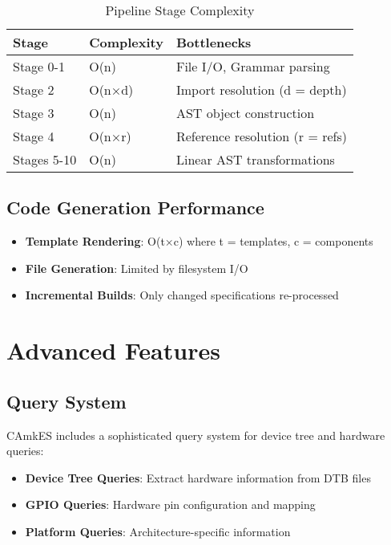 \documentclass[12pt,a4paper]{article}
\begin{document}
\begin{table}[h!]
\centering
\begin{tabular}{@{}lll@{}}
\toprule
\textbf{Stage} & \textbf{Complexity} & \textbf{Bottlenecks} \\
\midrule
Stage 0-1 & O(n) & File I/O, Grammar parsing \\
Stage 2 & O(n×d) & Import resolution (d = depth) \\
Stage 3 & O(n) & AST object construction \\
Stage 4 & O(n×r) & Reference resolution (r = refs) \\
Stages 5-10 & O(n) & Linear AST transformations \\
\bottomrule
\end{tabular}
\caption{Pipeline Stage Complexity}
\end{table}

\subsection{Code Generation Performance}
\begin{itemize}
    \item \textbf{Template Rendering}: O(t×c) where t = templates, c = components
    \item \textbf{File Generation}: Limited by filesystem I/O
    \item \textbf{Incremental Builds}: Only changed specifications re-processed
\end{itemize}

\section{Advanced Features}

\subsection{Query System}
CAmkES includes a sophisticated query system for device tree and hardware queries:

\begin{itemize}
    \item \textbf{Device Tree Queries}: Extract hardware information from DTB files
    \item \textbf{GPIO Queries}: Hardware pin configuration and mapping
    \item \textbf{Platform Queries}: Architecture-specific information
\end{itemize}
\end{document}
